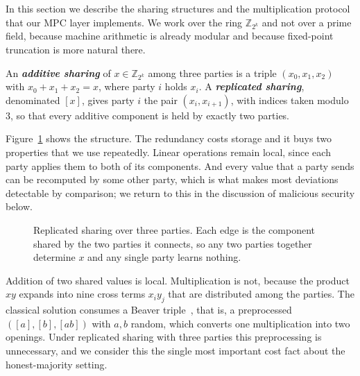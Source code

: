 \documentclass[11pt]{article}
\newcommand{\ib}[1]{\textbf{\emph{#1}}}
\newcommand{\Z}{\mathbb{Z}}
\begin{document}
In this section we describe the sharing structures and the multiplication protocol that our
MPC layer implements. We work over the ring $\Z_{2^k}$ and not over a prime field,
because machine arithmetic is already modular and because fixed-point truncation is more
natural there.

\begin{definition}
\label{def:sharings}
An \ib{additive sharing} of $x \in \Z_{2^k}$ among three parties is a triple
$(x_0,x_1,x_2)$ with $x_0+x_1+x_2 = x$, where party $i$ holds $x_i$. A \ib{replicated
sharing}, denominated $[x]$, gives party $i$ the pair $(x_i,x_{i+1})$, with indices taken
modulo $3$, so that every additive component is held by exactly two parties.
\end{definition}

Figure~\ref{fig:rss} shows the structure. The redundancy costs storage and it buys two
properties that we use repeatedly. Linear operations remain local, since each party applies
them to both of its components. And every value that a party sends can be recomputed by
some other party, which is what makes most deviations detectable by comparison; we return to
this in the discussion of malicious security below.

\begin{figure}[t]
\centering
{}
\caption{Replicated sharing over three parties. Each edge is the component shared by the two
parties it connects, so any two parties together determine $x$ and any single party learns
nothing.}
\label{fig:rss}
\end{figure}

Addition of two shared values is local. Multiplication is not, because the product $xy$
expands into nine cross terms $x_iy_j$ that are distributed among the parties. The classical
solution consumes a Beaver triple~\cite{Beaver}, that is, a preprocessed
$([a],[b],[ab])$ with $a,b$ random, which converts one multiplication into two openings.
Under replicated sharing with three parties this preprocessing is unnecessary, and we
consider this the single most important cost fact about the honest-majority setting.
\end{document}
